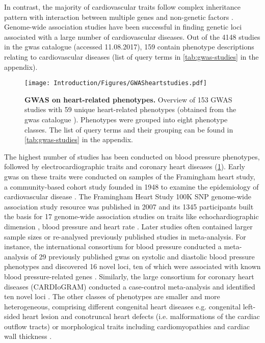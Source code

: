 In contrast, the majority of cardiovascular traits follow complex inheritance pattern with interaction between multiple genes and non-genetic factors \citep{Kathiresan2012}. Genome-wide association studies have been successful in finding genetic loci associated with a large number of cardiovascular diseases. Out of the \num{4148} studies in the \gls{gwas} catalogue (accessed 11.08.2017), \num{159} contain phenotype descriptions relating to cardiovascular diseases (list of query terms in \cref{tab:gwas-studies} in the appendix).
\\
\begin{figure}[hbtp]
	\centering
	\texttt{[image: Introduction/Figures/GWASheartstudies.pdf]}
	\caption[\textbf{GWAS on heart-related phenotypes. }]{\textbf{GWAS on heart-related phenotypes. } Overview of \num{153} GWAS studies with \num{59} unique heart-related phenotypes (obtained from the \gls{gwas} catalogue \citep[accessed on 11.08.2017]{MacArthur2017}). Phenotypes were grouped into eight phenotype classes. The list of query terms and their grouping can be found in \cref{tab:gwas-studies} in the appendix.} 
	 	\label{fig:gwas-heart}
\end{figure}

The highest number of studies has been conducted on blood pressure phenotypes, followed by electrocardiographic traits and coronary heart diseases (\cref{fig:gwas-heart}). Early \gls{gwas} on these traits were conducted on samples of the Framingham heart study, a community-based cohort study founded in 1948 to examine the epidemiology of cardiovascular disease \citep{Dawber1951,Kannel1979}. The Framingham Heart Study 100K SNP genome-wide association study resource was published in 2007 \citep{Cupples2007} and its \num{1345} participants built the basis for \num{17} genome-wide association studies on traits like echochardiographic dimension \citep{Vasan2007}, blood pressure \citep{Levy2007} and heart rate \citep{Newton-Cheh2007}. Later studies often contained larger sample sizes or re-analysed previously published studies in meta-analysis. For instance, the international consortium for blood pressure conducted a meta-analysis of \num{29} previously published \gls{gwas} on systolic and diastolic blood pressure phenotypes and discovered \num{16} novel loci, ten of which were associated with known blood pressure-related genes \citep{Ehret2011}. Similarly, the large consortium for coronary heart diseases  (CARDIoGRAM)  conducted a case-control meta-analysis  and identified ten novel loci  \citep{Nikpay2015}. The other classes of phenotypes are smaller and more heterogeneous, comprising different congenital heart diseases e.g. congenital left-sided heart lesion \citep{Mitchell2015,Hanchard2016} and conotruncal heart defects (i.e. malformations of the cardiac outflow tracts) \citep{Agopian2014} or morphological traits including cardiomyopathies \citep{ Villard2011} and cardiac wall thickness \citep{Vasan2009,Arnett2011}. 

